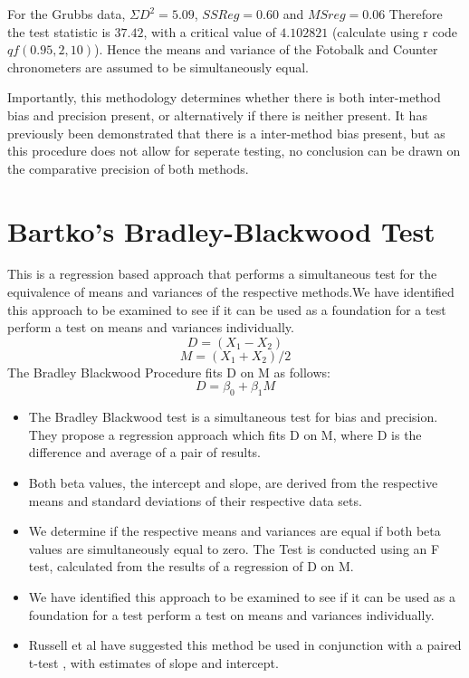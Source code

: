 \documentclass[12pt, a4paper]{report}
\theoremstyle{plain}
\theoremstyle{definition}
\theoremstyle{remark}
\begin{document}
	
	
	
	For the Grubbs data, $\Sigma D^{2}=5.09 $, $SSReg = 0.60$ and
	$MSreg=0.06$ Therefore the test statistic is $37.42$, with a
	critical value of $4.102821$ (calculate using r code
	$qf(0.95,2,10)$). Hence the means and variance of the Fotobalk and
	Counter chronometers are assumed to be simultaneously equal.
	
	Importantly, this methodology determines whether there is both
	inter-method bias and precision present, or alternatively if there
	is neither present. It has previously been demonstrated that there
	is a inter-method bias present, but as this procedure does not
	allow for seperate testing, no conclusion can be drawn on the
	comparative precision of both methods.

	
	



	\section{Bartko's Bradley-Blackwood Test}
	This is a regression based
	approach that performs a simultaneous test for the equivalence of
	means and variances of the respective methods.We have identified
	this approach  to be examined to see if it can be used as a
	foundation for a test perform a test on
	means and variances individually.
	\begin{equation}
	D = (X_{1}-X_{2})
	\end{equation}
	\begin{equation}
	M = (X_{1} + X_{2}) /2
	\end{equation}
	The Bradley Blackwood Procedure fits D on M as follows:\\
	\begin{equation}
	D = \beta_{0} + \beta_{1}M
	\end{equation}
	\begin{itemize}
		\item The Bradley Blackwood test is a simultaneous test for bias and
		precision. They propose a regression approach which fits D on M,
		where D is the difference and average of a pair of results.
		\item Both beta values, the intercept and slope, are derived from the respective means and
		standard deviations of their respective data sets.
		\item We determine if the respective means and variances are equal if
		both beta values are simultaneously equal to zero. The Test is
		conducted using an F test, calculated from the results of a
		regression of D on M.
		\item We have identified this approach  to be examined to see if it can
		be used as a foundation for a test perform a test on means and
		variances individually.
		\item Russell et al have suggested this method be used in conjunction
		with a paired t-test , with estimates of slope and intercept.
	\end{itemize}
	
\end{document}
